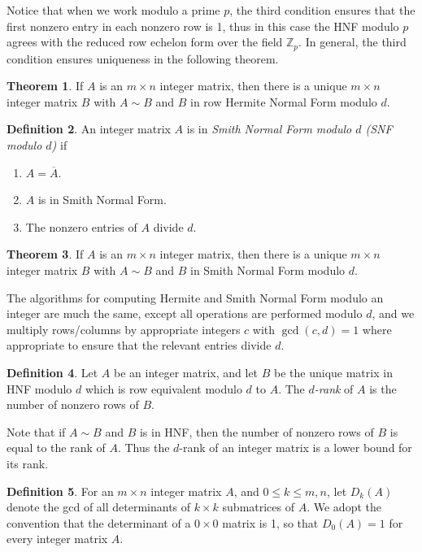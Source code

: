 \documentclass[12pt,a4paper,answers]{exam}
\newcommand{\Z}{\mathbb{Z}}
\theoremstyle{definition}
\newtheorem{theorem}{Theorem}[section]
\newtheorem{definition}[theorem]{Definition}
\begin{document}
Notice that when we work modulo a prime $p$, the third condition ensures that the first nonzero entry in each nonzero row is 1, thus in this case the HNF modulo $p$ agrees with the reduced row echelon form over the field $\Z_p$. In general, the third condition ensures uniqueness in the following theorem.

\begin{theorem}
  If $A$ is an $m\times n$ integer matrix, then there is a unique $m\times n$ integer matrix $B$ with $A\sim B$ and $B$ in row Hermite Normal Form modulo $d$.
\end{theorem}

\begin{definition}
  An integer matrix $A$ is in \emph{Smith Normal Form modulo $d$ (SNF modulo $d$)} if
  \begin{enumerate}
  \item $A=\overline{A}$.
  \item $A$ is in Smith Normal Form.
  \item The nonzero entries of $A$ divide $d$.
  \end{enumerate}
\end{definition}

\begin{theorem}
  If $A$ is an $m\times n$ integer matrix, then there is a unique $m\times n$ integer matrix $B$ with $A\sim B$ and $B$ in Smith Normal Form modulo $d$.
\end{theorem}

The algorithms for computing Hermite and Smith Normal Form modulo an integer are much the same, except all operations are performed modulo $d$, and we multiply rows/columns by appropriate integers $c$ with $\gcd(c,d)=1$ where appropriate to ensure that the relevant entries divide $d$.

\begin{definition}
  Let $A$ be an integer matrix, and let $B$ be the unique matrix in HNF modulo $d$ which is row equivalent modulo $d$ to $A$. The \emph{$d$-rank} of $A$ is the number of nonzero rows of $B$.
\end{definition}

Note that if $A\sim B$ and $B$ is in HNF, then the number of nonzero rows of $B$ is equal to the rank of $A$. Thus the $d$-rank of an integer matrix is a lower bound for its rank.

\begin{definition}
  For an $m\times n$ integer matrix $A$, and $0\leq k\leq m,n$, let $D_k(A)$ denote the gcd of all determinants of $k\times k$ submatrices of $A$. We adopt the convention that the determinant of a $0\times0$ matrix is 1, so that $D_0(A)=1$ for every integer matrix $A$.
\end{definition}
\end{document}
